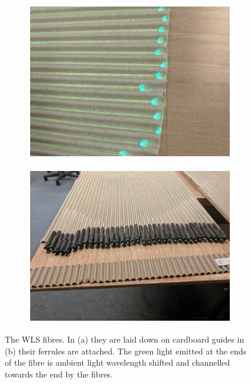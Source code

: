 \begin{figure}[!h]
\centering
\begin{subfigure}{.5\textwidth}
  \centering
  \includegraphics[width=\linewidth]{Chapter3/Figs/Raster/detCon013b_WlsFibres.png}
  \captionsetup{width=.9\linewidth}
  \caption{}
  \label{subFig:detCon013b_WlsFibres}
\end{subfigure}%
\begin{subfigure}{.5\textwidth}
  \centering
  \includegraphics[width=\linewidth]{Chapter3/Figs/Raster/detCon014b_WlsWithEnds.png}
  \captionsetup{width=.9\linewidth}
  \caption{}
  \label{subFig:detCon014b_WlsWithEnds}
\end{subfigure}
\caption[WLS fibres having their ferrules attached.]{The WLS fibres. In (a) they are laid down on cardboard guides in (b) their ferrules are attached. The green light emitted at the ends of the fibre is ambient light wavelength shifted and channelled towards the end by the fibres.} %
\label{fig:detCon_WlsFibres_WlsWithEnds}
\end{figure}

